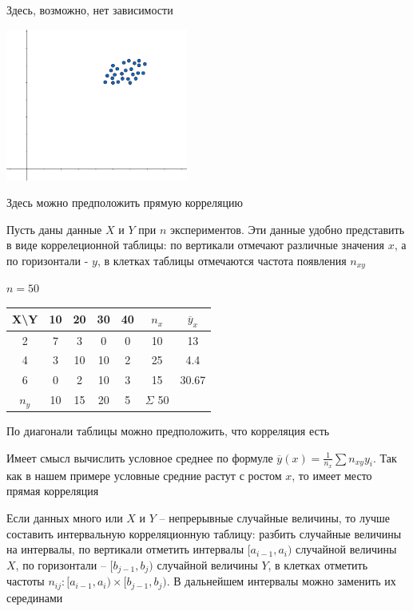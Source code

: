 \begin{enumerate}
\begin{multicols}{2}
\begin{center}
            Здесь, возможно, нет зависимости

            \includegraphics[height=5cm]{mathstat/images/mathstat_2025_04_01_2}

            Здесь можно предположить прямую корреляцию
        \end{center}
    \end{multicols}

    Пусть даны данные $X$ и $Y$ при $n$ экспериментов. Эти данные удобно представить в виде коррелеционной таблицы:
    по вертикали отмечают различные значения $x$, а по горизонтали - $y$, в клетках таблицы отмечаются частота появления $n_{xy}$

    \Ex $n = 50$

    \smallvspace

    \begin{tabular}{c|c|c|c|c|c|c}
        X\backslash Y & 10 & 20 & 30 & 40 & $n_x$ & $\overline y_x$ \\
        \hline
        2 & 7 & 3 & 0 & 0 & 10 & 13 \\
        \hline
        4 & 3 & 10 & 10 & 2 & 25 & 4.4 \\
        \hline
        6 & 0 & 2 & 10 & 3 & 15 & 30.67 \\
        \hline
        $n_y$ & 10 & 15 & 20 & 5 & $\Sigma$ 50 & \\
    \end{tabular}

    \smallvspace

    По диагонали таблицы можно предположить, что корреляция есть

    Имеет смысл вычислить условное среднее по формуле $\overline y (x) = \frac{1}{n_x} \sum n_{xy} y_i$. Так как в нашем примере
    условные средние растут с ростом $x$, то имеет место прямая корреляция

    \Notas Если данных много или $X$ и $Y$ -- непрерывные случайные величины, то лучше составить интервальную корреляционную таблицу:
    разбить случайные величины на интервалы, по вертикали отметить интервалы $[a_{i - 1}, a_i)$ случайной величины $X$, 
    по горизонтали -- $[b_{j - 1}, b_j)$ случайной величины $Y$, в клетках 
    отметить частоты $n_{ij} : [a_{i - 1}, a_i) \times [b_{j - 1}, b_j)$. В дальнейшем интервалы можно заменить их серединами


\end{enumerate}
